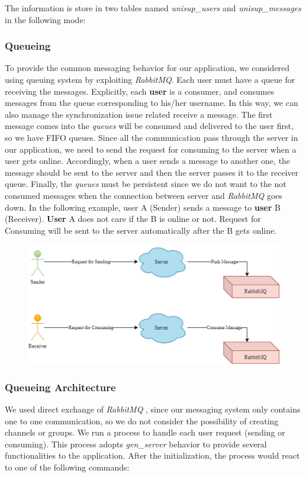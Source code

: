 The information is store in two tables named \textit{unisup\_users} and \textit{unisup\_messages} in the following mode:


\subsubsection{Queueing}
To provide the common messaging behavior for our application, we considered using queuing system by exploiting \textit{RabbitMQ}. Each user must have a queue for receiving the messages. Explicitly, each \textbf{user}  is a consumer, and consumes messages from the queue corresponding to his/her username. In this way, we can also manage the synchronization issue related receive a message. The first message comes into the \textit{queues} will be consumed and delivered to the user first, so we have FIFO queues. Since all the communication pass through the server in our application, we need to send the request for consuming to the server when a user gets online. Accordingly, when a user sends a message to another one, the message should be sent to the server and then the server passes it to the receiver queue. Finally, the \textit{queues} must be persistent since we do not want to the not consumed messages when the connection between server and \textit{RabbitMQ} goes down. 
In the following example, user A (Sender) sends a message to \textbf{user} B (Receiver). \textbf{User}  A does not care if the B is online or not.  Request for Consuming will be sent to the server automatically after the B gets online. 

\begin{figure}[H]
	\centering
	\includegraphics[width=\textwidth]{img/rabbitMQ.png}  
\end{figure}

\subsubsection{Queueing Architecture}
We used direct exchange of \textit{RabbitMQ} , since our messaging system only contains one to one communication, so we do not consider the possibility of creating channels or groups.
We run a process to handle each user request (sending or consuming). This process adopts \textit{gen\_server} behavior to provide several functionalities to the application. After the initialization, the process would react to one of the following commands:

